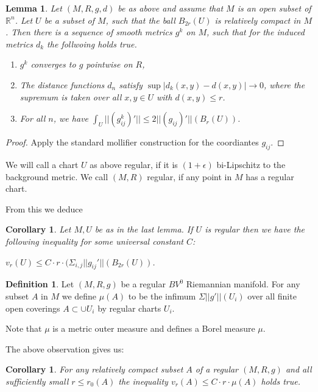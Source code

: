 \documentclass[12pt,leqno]{amsart}
\numberwithin{equation}{section}
\newtheorem{lem}[thm]{Lemma}
\newtheorem{cor}[thm]{Corollary}
\theoremstyle{definition}
\newtheorem{defn}[thm]{Definition}%
\theoremstyle{remark}
\newcommand{\R}{\mathbb{R}}
\begin{document}
 \begin{lem}
 Let $(M,R,g,d)$ be as above and assume that $M$ is an open subset of $\R^n$. Let $U$ be a subset
 of $M$, such that the ball $B_{2r} (U)$ is relatively compact in $M$. Then
 there is a sequence of smooth metrics $g^k$ on $M$, such that for the induced metrics $d_k$ the follwoing holds true.

 \begin{enumerate}
 \item $g^k$ converges to $g$ pointwise on $R$,
 \item  The distance functions $d_n$ satisfy $\sup |d_k (x,y)- d(x,y)| \to 0$, where the supremum is taken
 over all $x,y \in U$ with $ d(x,y) \leq r$.
 \item For all $n$, we have $\int _U  ||(g^k_{ij} )'|| \leq 2||(g _{ij})'||(  B_r (U))$.
 \end{enumerate}
\end{lem}




\begin{proof}
Apply the standard mollifier construction for the coordiantes $g_{ij}$.
\end{proof}


  We will call a chart $U$ as above regular, if it is $(1+\epsilon)$ bi-Lipschitz to
  the background metric. We call $(M,R)$ regular, if any point in $M$ has a regular
  chart.

 From this we deduce
 \begin{cor}\label{cor-dc-vr}
 Let $M,U$ be  as in the last lemma. If $U$ is regular  then we have the following inequality for some
 universal constant $C$:

 $v_r (U) \leq C \cdot r \cdot (\Sigma _{i,j} ||g_{ij} '|| (B_{2r} (U))$.
\end{cor}


\begin{defn}
Let $(M,R,g)$ be a regular $BV^0$ Riemannian manifold. For any  subset
$A$ in $M$ we define $\mu (A)$ to be the infimum $\Sigma ||g '|| (U_i)$   over all finite open coverings $A\subset  \cup U_i$
by regular charts $U_i$.
\end{defn}

 Note that $\mu$ is a metric outer measure and defines a Borel measure $\mu$.


 The above observation gives us:
 \begin{cor}\label{cor-mu-dc}
 For any relatively compact subset $A$ of a regular $(M,R,g)$ and all sufficiently small $r \leq r_0 (A)$ the
 inequality $v_r (A) \leq C \cdot r \cdot \mu (A)$ holds true.
 \end{cor}
\end{document}
